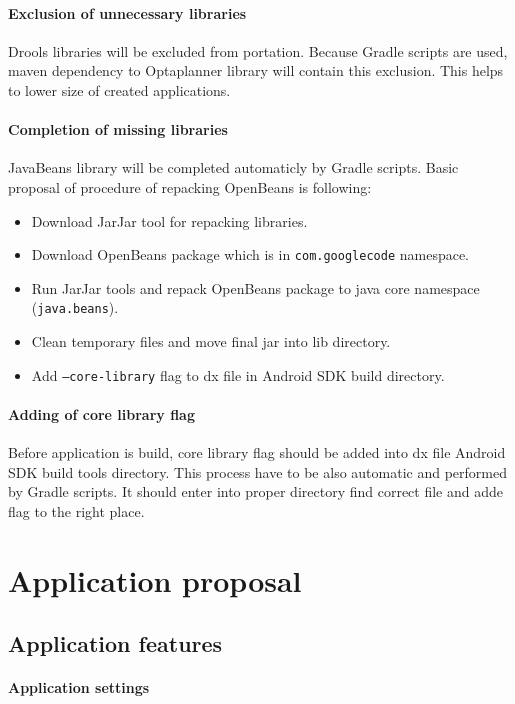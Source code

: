 \paragraph{Exclusion of unnecessary libraries}
Drools libraries will be excluded from portation. Because Gradle scripts are used, maven dependency to Optaplanner
library will contain this exclusion. This helps to lower size of created applications.

\paragraph{Completion of missing libraries}
JavaBeans library will be completed automaticly by Gradle scripts. Basic proposal of procedure of repacking OpenBeans is
following:
\begin{itemize}
\item Download JarJar tool for repacking libraries.
\item Download OpenBeans package which is in \texttt{com.googlecode} namespace.
\item Run JarJar tools and repack OpenBeans package to java core namespace (\texttt{java.beans}).
\item Clean temporary files and move final jar into lib directory.
\item Add \texttt{--core-library} flag to dx file in Android SDK build directory.
\end{itemize}

\paragraph{Adding of core library flag}
Before application is build, core library flag should be added into dx file Android SDK build tools directory. This
process have to be also automatic and performed by Gradle scripts. It should enter into proper directory find correct
file and adde flag to the right place.

\section{Application proposal}

\subsection{Application features}

\paragraph{Application settings}

